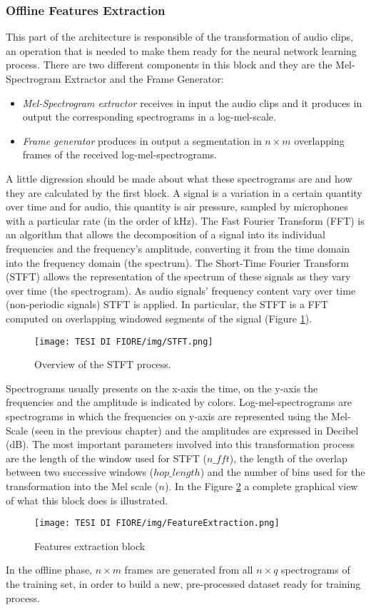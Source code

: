 \subsubsection{Offline Features Extraction}
This part of the architecture is responsible of the transformation of audio clips, an operation that is needed to make them ready for the neural network learning process. There are two different components in this block and they are the Mel-Spectrogram Extractor and the Frame Generator:
\begin{itemize}
    \item {\textit{Mel-Spectrogram extractor} receives in input the audio clips and it produces in output the corresponding spectrograms in a log-mel-scale.}
    \item {\textit{Frame generator} produces in output a segmentation in $n \times m$ overlapping frames of the received log-mel-spectrograms.  }
\end{itemize}
A little digression should be made about what these spectrograms are and how they are calculated by the first block. A signal is a variation in a certain quantity over time and for audio, this quantity is air pressure, sampled by microphones with a particular rate (in the order of kHz). The Fast Fourier Transform (FFT) is an algorithm that allows the decomposition of a signal into its individual frequencies and the frequency’s amplitude, converting it from the time domain into the frequency domain (the spectrum). The Short-Time Fourier Transform (STFT) allows the representation of the spectrum of these signals as they vary over time (the spectrogram). As audio signals' frequency content vary over time (non-periodic signals) STFT is applied. In particular, the STFT is a FFT computed on overlapping windowed segments of the signal (Figure \ref{sftf}).\\
\begin{figure}[ht]
\texttt{[image: TESI DI FIORE/img/STFT.png]}
\centering
\caption{Overview of the STFT process.}
\label{sftf}
\end{figure}
Spectrograms usually presents on the x-axis the time, on the y-axis the frequencies and the amplitude is indicated by colors. Log-mel-spectrograms are spectrograms in which the frequencies on y-axis are represented using the Mel-Scale (seen in the previous chapter) and the amplitudes are expressed in Decibel (dB). The most important parameters involved into this transformation process are the length of the window used for STFT ($n\_fft$), the length of the overlap between two successive windows ($hop\_length$) and the number of bins used for the transformation into the Mel scale ($n$).
In the Figure \ref{features-extraction} a complete graphical view of what this block does is illustrated.
\begin{figure}[ht]
\texttt{[image: TESI DI FIORE/img/FeatureExtraction.png]}
\centering
\caption{Features extraction block}
\label{features-extraction}
\end{figure}
In the offline phase, $n \times m$ frames are generated from all $n \times q$ spectrograms of the training set, in order to build a new, pre-processed dataset ready for training process.
